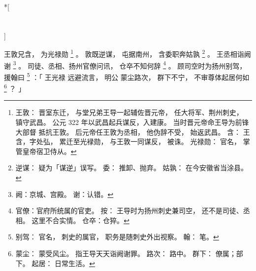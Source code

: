 
\switchcolumn[0]*[\section{}]

王敦兄含，
为光禄勋%
\footnote{%
    王敦：
        晋室东迁，
        与堂兄弟王导一起辅佐晋元帝，
        任大将军、荆州刺史，
        镇守武昌。
        公元 322 年以武昌起兵谋反，入建康。
        当时晋元帝命王导为前锋大部督
        抵抗王敦。
        后元帝任王敦为丞相，
        他伪辞不受，
        始返武昌。
    含：
        王含，字处弘，
        累迁至光䘵勋，
        与王敦一同谋反，
        被诛。
    光禄勋：
        官名，
        掌管皇帝宿卫侍从。
}%
。
敦既逆谋，
屯据南州，
含委职奔姑孰%
\footnote{%
    逆谋：
        疑为「谋逆」误写。
    委：
        推卸、抛弃。
    姑孰：
        在今安徽省当涂县。
        
}%
。
王丞相诣阙谢%
\footnote{%
    阙：京城、宫殿。
    谢：认错。
}%
。
司徒、丞相、扬州官僚问讯，
仓卒不知何辞%
\footnote{%
    官僚：官府所统属的官吏。
          按：
          王导时为扬州刺史兼司空，
          还不是司徒、丞相。
          这里不合实情。
    仓卒：仓猝。
}%
。
顾司空时为扬州别驾，
援翰曰%
\footnote{%
    别驾：
        官名，
        刺史的属官，
        职务是随刺史外出视察。
    翰：
        笔。
}%
：「
    王光禄
    远避流言，
    明公
    蒙尘路次，
    群下不宁，
    不审尊体起居何如%
    \footnote{%
        蒙尘：
            蒙受风尘。
            指王导天天诣阙谢罪。
        路次：
            路中。
        群下：
            僚属；部下。
        起居：
            日常生活。
    }%
    ？
」

\switchcolumn


